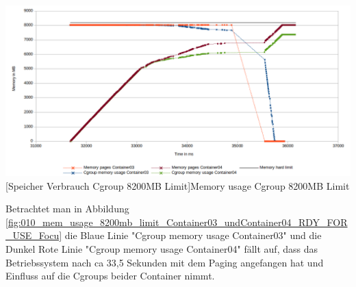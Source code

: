 \vspace{1em}
\begin{minipage}{\linewidth}
	\centering
	\includegraphics[width=1\linewidth]{pics/010_mem_usage_8200mb_limit_Container03_undContainer04_RDY_FOR_USE_Focus.png}
	[Speicher Verbrauch Cgroup 8200MB Limit]{Memory usage Cgroup 8200MB Limit}
	\label{fig:010_mem_usage_8200mb_limit_Container03_undContainer04_RDY_FOR_USE_Focu}
\end{minipage}

Betrachtet man in Abbildung \ref{fig:010_mem_usage_8200mb_limit_Container03_undContainer04_RDY_FOR_USE_Focu} die Blaue Linie "Cgroup memory usage Container03" und die Dunkel Rote Linie "Cgroup memory usage Container04" fällt auf, dass das Betriebssystem nach ca 33,5 Sekunden mit dem Paging angefangen hat und Einfluss auf die Cgroups beider Container nimmt. 

\pagebreak 
